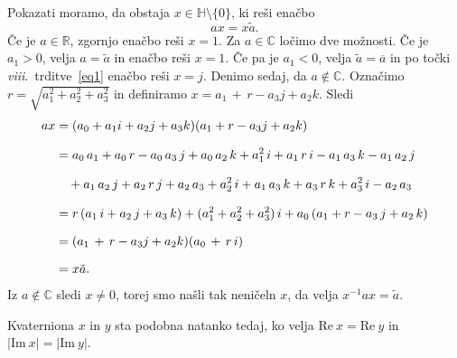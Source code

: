 \documentclass[mat1, tisk]{fmfdelo}
\numberwithin{equation}{section}
\begin{document}
\begin{dokaz}
    Pokazati moramo, da obstaja $x \in \mathbb{H} \setminus \{0\}$, ki reši enačbo
    \begin{equation*}
        ax = x \tilde{a}.
    \end{equation*}
    Če je $a \in \mathbb{R}$, zgornjo enačbo reši $x = 1$. Za $a \in \mathbb{C}$ ločimo dve možnosti. Če je $a_1 > 0$, velja $a = \tilde{a}$ in enačbo reši $x = 1$. 
    Če pa je $a_1 < 0$, velja $\tilde{a} = \overline{a}$ in po točki \textit{viii}.\ trditve~\ref{eq1} enačbo reši $x = j$.
    Denimo sedaj, da $a \notin \mathbb{C}$. Označimo $r = \sqrt{a_1^2 + a_2^2 + a_3^2}$ in definiramo 
    $x = a_1 \, + \, r -a_3j + a_2k$. Sledi 
        \begin{equation*}
        \setlength{\jot}{10pt}
            \begin{aligned}
                ax &= (a_0 + a_1 i  +  a_2 j  +  a_3 k)( a_1  +  r -a_3j + a_2k)   \\
                &= a_0 \, a_1 + a_0 \, r - a_0 \, a_3 \, j + a_0 \, a_2 \, k + a_1^2 \, i  + a_1 \, r \, i - a_1\, a_3 \, k - a_1\, a_2 \, j \\
                &\quad + a_1\, a_2 \, j + a_2\, r \, j + a_2\, a_3 + a_2^2 \, i + a_1\, a_3 \, k + a_3\, r \, k + a_3^2 \, i - a_2\, a_3 \\
                &= r \, (a_1 \, i  +  a_2 \, j  +  a_3 \, k) + (a_1^2 + a_2^2 + a_3^2)\, i + a_0 \, (a_1 + r -a_3 \, j + a_2 \, k) \\
                &= ( a_1 \, + \, r -a_3j + a_2k) (a_0 \, + \, r \, i) \\
                &= x \tilde{a}.
            \end{aligned}
    \end{equation*}
    Iz $a \notin \mathbb{C}$ sledi $x \neq 0$, torej smo našli tak neničeln $x$, da velja $x^{-1}ax = \tilde{a}$.  
\end{dokaz}

\begin{lema}\label{pod}
    Kvaterniona $x$ in $y$ sta podobna natanko tedaj, ko velja $\mathrm{Re} \: x = \mathrm{Re} \: y$ in $|\mathrm{Im} \: x | = |\mathrm{Im} \: y |$.
\end{lema}
\end{document}
